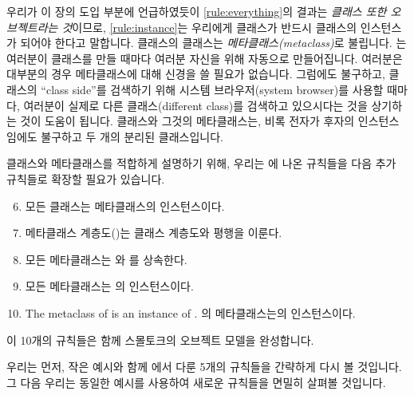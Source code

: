 \documentclass[a4paper,10pt,twoside]{book}
\begin{document}
우리가 이 장의 도입 부분에 언급하였듯이 \ref{rule:everything}의 결과는 \emph{클래스 또한 오브젝트라는 것}이므로, \ref{rule:instance}는 우리에게 클래스가 반드시 클래스의 인스턴스가 되어야 한다고 말합니다. 
클래스의 클래스는 \emph{메타클래스(metaclass)}로 불립니다. 
는 여러분이 클래스를 만들 때마다 여러분 자신을 위해 자동으로 만들어집니다. 
여러분은 대부분의 경우 메타클래스에 대해 신경을 쓸 필요가 없습니다. 
그럼에도 불구하고, 클래스의 ``class side''를 검색하기 위해 시스템 브라우저(system browser)를 사용할 때마다, 여러분이 실제로 다른 클래스(different class)를 검색하고 있으시다는 것을 상기하는 것이 도움이 됩니다. 
클래스와 그것의 메타클래스는, 비록 전자가 후자의 인스턴스임에도 불구하고 두 개의 분리된 클래스입니다.

클래스와 메타클래스를 적합하게 설명하기 위해, 우리는 에 나온 규칙들을 다음 추가 규칙들로 확장할 필요가 있습니다.

\begin{enumerate}[label={\textbf{Rule \arabic{*}}.}, ref={Rule \arabic{*}}, leftmargin=*, widest=10]
\setcounter{enumi}{5}
\item{} \label{rule:metaclass}
    모든 클래스는 메타클래스의 인스턴스이다.

\item{} \label{rule:parallelhierarchy}
    메타클래스 계층도()는 클래스 계층도와 평행을 이룬다.

\item{} \label{rule:behavior}
    모든 메타클래스는 와 를 상속한다.

\item{} \label{rule:metaclassclass}
    모든 메타클래스는 의 인스턴스이다.

\item{} \label{rule:metaclassmetaclass}
	The metaclass of  is an instance of .
    의 메타클래스는의 인스턴스이다.

\end{enumerate}

\noindent
이 10개의 규칙들은 함께 스몰토크의 오브젝트 모델을 완성합니다.

우리는 먼저, 작은 예시와 함께 에서 다룬 5개의 규칙들을 간략하게 다시 볼 것입니다. 그 다음 우리는 동일한 예시를 사용하여 새로운 규칙들을 면밀히 살펴볼 것입니다. 

\end{document}
